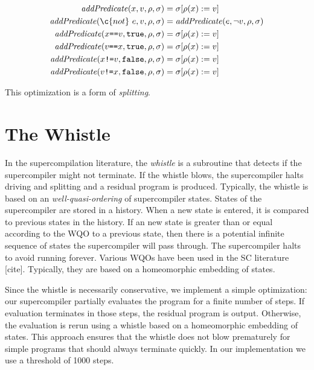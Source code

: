 \begin{align*}
  \mathit{addPredicate}(x, v, \rho, \sigma) &= \sigma[\rho(x) := v] \\ 
  \mathit{addPredicate}(\c{not}~e, v, \rho, \sigma) &=
    \mathit{addPredicate}(e, \lnot v, \rho, \sigma) \\
  \mathit{addPredicate}(x \mbox{\verb~==~} v, \mathtt{true}, \rho, \sigma) &= \sigma[\rho(x) := v] \\ 
  \mathit{addPredicate}(v \mbox{\verb~==~} x, \mathtt{true}, \rho, \sigma) &= \sigma[\rho(x) := v] \\ 
  \mathit{addPredicate}(x \mbox{\verb~!=~} v, \mathtt{false}, \rho, \sigma) &= \sigma[\rho(x) := v] \\ 
  \mathit{addPredicate}(v \mbox{\verb~!=~} x, \mathtt{false}, \rho, \sigma) &= \sigma[\rho(x) := v] \\ 
\end{align*}

This optimization is a form of \emph{splitting}.

\section{The Whistle}

In the supercompilation literature, the \emph{whistle}
is a subroutine that detects if the supercompiler 
might not terminate. If the whistle blows, the supercompiler 
halts driving and splitting and a residual program is produced.
Typically, the whistle is based on an \emph{well-quasi-ordering} of 
supercompiler states. 
States of the supercompiler are stored in a history.
When a new state is entered, it is compared to previous states
in the history. If an new state is greater than or equal according to the WQO to a previous
state, then 
there is a potential infinite sequence of states
the supercompiler will pass through. The supercompiler halts to avoid
running forever.
Various WQOs have been used in the SC literature [cite].
Typically, they are based on a homeomorphic embedding of states.

Since the whistle is necessarily conservative, we implement a simple
optimization: our supercompiler partially evaluates the program for a finite number
of steps. If evaluation terminates in those steps, the residual program is output.
Otherwise, the evaluation is rerun using a whistle based on a homeomorphic embedding of states.
This approach ensures that the whistle does not blow prematurely for simple programs that should always terminate quickly.
In our implementation we use a threshold of 1000 steps.

